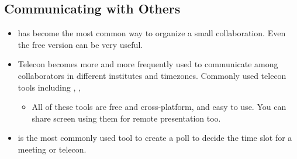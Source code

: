 \documentclass[letterpaper,10pt,english]{sphinxmanual}
\begin{document}
\subsection{Communicating with Others}
\label{\detokenize{resource/research/getting_started:communicating-with-others}}\begin{itemize}
\item {} 
 has become the most common way to
organize a small collaboration. Even the free version can be very
useful.

\item {} 
Telecon becomes more and more frequently used to communicate among
collaborators in different institutes and timezones. Commonly used
telecon tools including ,
,
\begin{itemize}
\item {} 
All of these tools are free and cross-platform, and easy to use.
You can share screen using them for remote presentation too.

\end{itemize}

\item {} 
 is the most commonly used
tool to create a poll to decide the time slot for a meeting or
telecon.

\end{itemize}
\end{document}
